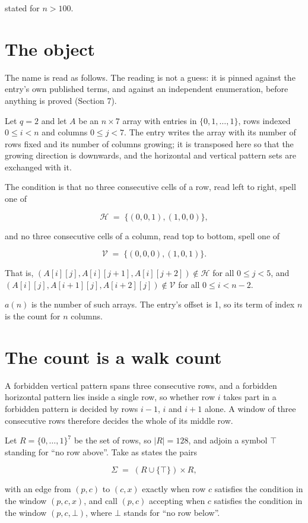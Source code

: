 \documentclass[11pt]{article}
\theoremstyle{definition}
\begin{document}
stated for $n > 100$.

\section{The object}

The name is read as follows. The reading is not a guess: it is pinned against the entry's own published terms, and against an independent enumeration, before anything is proved (Section 7).

Let $q = 2$ and let $A$ be an $n \times 7$ array with entries in $\{0,1,\dots,1\}$, rows indexed $0 \le i < n$ and columns $0 \le j < 7$. The entry writes the array with its number of rows fixed and its number of columns growing; it is transposed here so that the growing direction is downwards, and the horizontal and vertical pattern sets are exchanged with it.

The condition is that no three consecutive cells of a row, read left to right, spell one of

\[\mathcal{H} \;=\; \{(0,0,1), (1,0,0)\},\]

and no three consecutive cells of a column, read top to bottom, spell one of

\[\mathcal{V} \;=\; \{(0,0,0), (1,0,1)\}.\]

That is, $(A[i][j],A[i][j{+}1],A[i][j{+}2]) \notin \mathcal{H}$ for all $0 \le j < 5$, and $(A[i][j],A[i{+}1][j],A[i{+}2][j]) \notin \mathcal{V}$ for all $0 \le i < n-2$.

$a(n)$ is the number of such arrays. The entry's offset is 1, so its term of index $n$ is the count for $n$ columns.

\section{The count is a walk count}

A forbidden vertical pattern spans three consecutive rows, and a forbidden horizontal pattern lies inside a single row, so whether row $i$ takes part in a forbidden pattern is decided by rows $i-1$, $i$ and $i+1$ alone. A window of three consecutive rows therefore decides the whole of its middle row.

Let $R = \{0,\dots,1\}^{7}$ be the set of rows, so $|R| = 128$, and adjoin a symbol $\top$ standing for ``no row above''. Take as states the pairs

\[\Sigma \;=\; (R \cup \{\top\}) \times R,\]

with an edge from $(p,c)$ to $(c,x)$ exactly when row $c$ satisfies the condition in the window $(p,c,x)$, and call $(p,c)$ accepting when $c$ satisfies the condition in the window $(p,c,\bot)$, where $\bot$ stands for ``no row below''.
\end{document}
